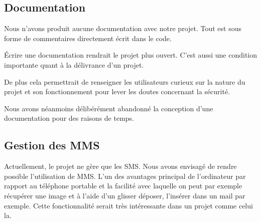 
\subsection{Documentation}

Nous n'avons produit aucune documentation avec notre projet.
Tout est sous forme de commentaires directement écrit dans le code.

Écrire une documentation rendrait le projet plus ouvert.
C'est aussi une condition importante quant à la délivrance d'un projet.

De plus cela permettrait de renseigner les utilisateurs curieux sur la nature du projet et son fonctionnement pour lever les doutes concernant la sécurité.

Nous avons néanmoins délibérément abandonné la conception d'une documentation pour des raisons de temps.




\subsection{Gestion des MMS}

Actuellement, le projet ne gère que les SMS. Nous avons envisagé de rendre possible l'utilisation de MMS. L'un des avantages principal
de l'ordinateur par rapport au téléphone portable et la facilité avec laquelle on peut par exemple récupérer une image et à l'aide d'un
glisser déposer, l'insérer dans un mail par exemple. Cette fonctionnalité serait très intéressante dans un projet comme celui la. 